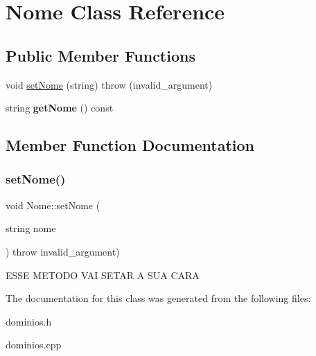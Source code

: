 \hypertarget{classNome}{}\section{Nome Class Reference}
\label{classNome}
\subsection*{Public Member Functions}
\begin{DoxyCompactItemize}
\item 
void \hyperlink{classNome_ab1507b81047efb89b50b6be0d33c08e5}{set\+Nome} (string)  throw (invalid\+\_\+argument)
\item 
\mbox{\label{classNome_a1c08f5b9827a1e97a2631196ff99fdef}} 
string {\bfseries get\+Nome} () const
\end{DoxyCompactItemize}


\subsection{Member Function Documentation}
\mbox{\label{classNome_ab1507b81047efb89b50b6be0d33c08e5}} 
\subsubsection{\texorpdfstring{set\+Nome()}{setNome()}}
{\footnotesize\ttfamily void Nome\+::set\+Nome (\begin{DoxyParamCaption}\item[{string}]{nome }\end{DoxyParamCaption}) throw  invalid\+\_\+argument) }

E\+S\+SE M\+E\+T\+O\+DO V\+AI S\+E\+T\+AR A S\+UA C\+A\+RA 

The documentation for this class was generated from the following files\+:\begin{DoxyCompactItemize}
\item 
dominios.\+h\item 
dominios.\+cpp\end{DoxyCompactItemize}
